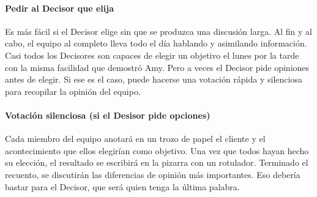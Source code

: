 \documentclass[10pt]{article}
\begin{document}
\begin{multicols}{2}
\paragraph{Pedir al Decisor que elija}
Es más fácil si el Decisor elige sin que se produzca una discusión larga. Al fin y al cabo, el equipo al completo lleva todo el día hablando y asimilando información. Casi todos los Decisores son capaces de elegir un objetivo el lunes por la tarde con la misma facilidad que demostró Amy. Pero a veces el Decisor pide opiniones antes de elegir. Si ese es el caso, puede hacerse una votación rápida y silenciosa para recopilar la opinión del equipo.
\paragraph*{Votación silenciosa (si el Desisor pide opciones)}
Cada miembro del equipo anotará en un trozo de papel el cliente y el acontecimiento que ellos elegirían como objetivo. Una vez que todos hayan hecho su elección, el resultado se escribirá en la pizarra con un rotulador. Terminado el recuento, se discutirán las diferencias de opinión más importantes. Eso debería bastar para el Decisor, que será quien tenga la última palabra.\\

\end{multicols}
\end{document}
